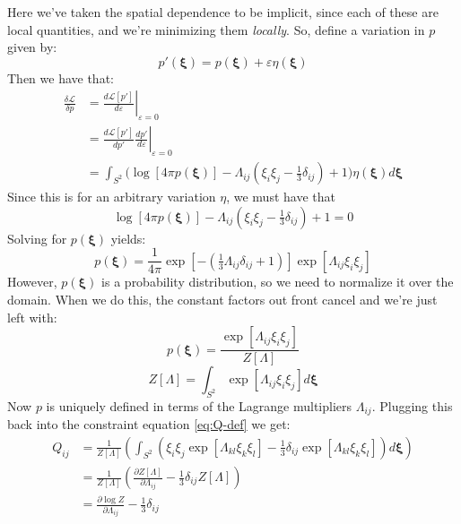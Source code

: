 \documentclass[reqno]{article}
\begin{document}
	Here we've taken the spatial dependence to be implicit, since each of these are local quantities, and we're minimizing them \textit{locally}.
	So, define a variation in $p$ given by:
	\begin{equation}
		p'(\mathbf{\xi}) 
		= p(\mathbf{\xi}) + \varepsilon \eta(\mathbf{\xi})
	\end{equation}
	Then we have that:
	\begin{equation}
	\begin{split}
		\frac{\delta \mathcal{L}}{\delta p}
		&= \left.\frac{d \mathcal{L}[p']}{d \varepsilon} \right|_{\varepsilon = 0} \\
		&= \left.\frac{d \mathcal{L} [p']}{d p'} \frac{d p'}{d \varepsilon} \right|_{\varepsilon = 0} \\
		&= \int_{S^2} \biggl(
		\log \left[ 4\pi p(\mathbf{\xi}) \right]
		- \Lambda_{ij} \left( \xi_i \xi_j - \tfrac13 \delta_{ij} \right)
		+ 1
		\biggr) \eta(\mathbf{\xi}) d \mathbf{\xi}
	\end{split}
	\end{equation}
	Since this is for an arbitrary variation $\eta$, we must have that
	\begin{equation}
	\log \left[ 4\pi p(\mathbf{\xi}) \right]
	- \Lambda_{ij} \left( \xi_i \xi_j - \tfrac13 \delta_{ij} \right)
	+ 1
	= 0
	\end{equation}
	Solving for $p(\mathbf{\xi})$ yields:
	\begin{equation}
		p(\mathbf{\xi}) 
		= \frac{1}{4 \pi}
		\exp \left[
		- \left(\tfrac13 \Lambda_{ij} \delta_{ij} + 1\right)
		\right]
		\exp\left[
		\Lambda_{ij} \xi_i \xi_j
		\right]
	\end{equation}
	However, $p(\mathbf{\xi})$ is a probability distribution, so we need to normalize it over the domain.
	When we do this, the constant factors out front cancel and we're just left with:
	\begin{equation} \label{eq:p-expr}
		p( \mathbf{\xi} )
		= \frac{\exp\left[ \Lambda_{ij} \xi_i \xi_j \right]}{Z\left[\Lambda\right]}
	\end{equation}
	\begin{equation}
		Z\left[\Lambda\right]
		= \int_{S^2} \exp[\Lambda_{ij} \xi_i \xi_j] d\mathbf{\xi}
	\end{equation}
	Now $p$ is uniquely defined in terms of the Lagrange multipliers $\Lambda_{ij}$.
	Plugging this back into the constraint equation \eqref{eq:Q-def} we get:
	\begin{equation}
	\begin{split}
		Q_{ij} 
		&= \frac{1}{Z[\Lambda]} \left( 
		\int_{S^2} \left( \xi_i \xi_j \exp[\Lambda_{kl} \xi_k \xi_l]
		- \tfrac13 \delta_{ij} \exp[\Lambda_{kl} \xi_k \xi_l] \right)
		d \mathbf{\xi} \right) \\
		&= \frac{1}{Z[\Lambda]} \left(
		\frac{\partial Z[\Lambda]}{\partial \Lambda_{ij}} - \tfrac13 \delta_{ij} Z[\Lambda]
		\right) \\
		&= \frac{\partial \log Z}{\partial \Lambda_{ij}} - \tfrac13 \delta_{ij}
	\end{split}
	\end{equation}
\end{document}
